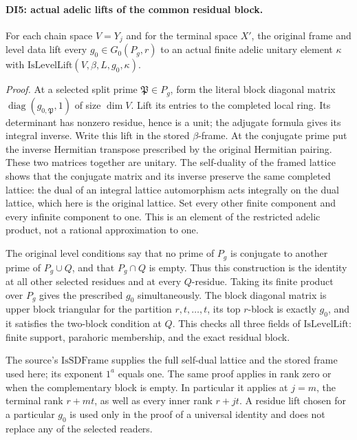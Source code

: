 \paragraph{DI5: actual adelic lifts of the common residual block.}
\label{claim:DI5}
For each chain space \(V=Y_j\) and for the terminal space \(X'\),
the original frame and level data lift every
\(g_0\in G_0(P_g,r)\) to an actual finite adelic unitary element
\(\kappa\) with \(\mathrm{IsLevelLift}(V,\beta,L,g_0,\kappa)\).

\emph{Proof.}
At a selected split prime \(\mathfrak P\in P_g\), form the literal
block diagonal matrix \(\operatorname{diag}(g_{0,\mathfrak P},1)\)
of size \(\dim V\). Lift its entries to the completed local ring.
Its determinant has nonzero residue, hence is a unit; the adjugate
formula gives its integral inverse. Write this lift in the stored
\(\beta\)-frame. At the conjugate prime put the inverse Hermitian
transpose prescribed by the original Hermitian pairing. These two
matrices together are unitary. The self-duality of the framed lattice
shows that the conjugate matrix and its inverse preserve the same
completed lattice: the dual of an integral lattice automorphism acts
integrally on the dual lattice, which here is the original lattice.
Set every other finite component and every infinite component to one.
This is an element of the restricted adelic product, not a rational
approximation to one.

The original level conditions say that no prime of \(P_g\) is
conjugate to another prime of \(P_g\cup Q\), and that \(P_g\cap Q\)
is empty. Thus this construction is the identity at all other selected
residues and at every \(Q\)-residue. Taking its finite product over
\(P_g\) gives the prescribed \(g_0\) simultaneously. The block
diagonal matrix is upper block triangular for the partition
\(r,t,\ldots,t\), its top \(r\)-block is exactly \(g_0\), and it
satisfies the two-block condition at \(Q\). This checks all three
fields of \(\mathrm{IsLevelLift}\): finite support, parahoric
membership, and the exact residual block.

The source's \(\mathrm{IsSDFrame}\) supplies the full self-dual
lattice and the stored frame used here; its exponent \(1^a\) equals
one. The same proof applies in rank zero or when the complementary
block is empty. In particular it applies at \(j=m\), the terminal
rank \(r+mt\), as well as every inner rank \(r+jt\). A residue
lift chosen for a particular \(g_0\) is used only in the proof of a
universal identity and does not replace any of the selected readers.

